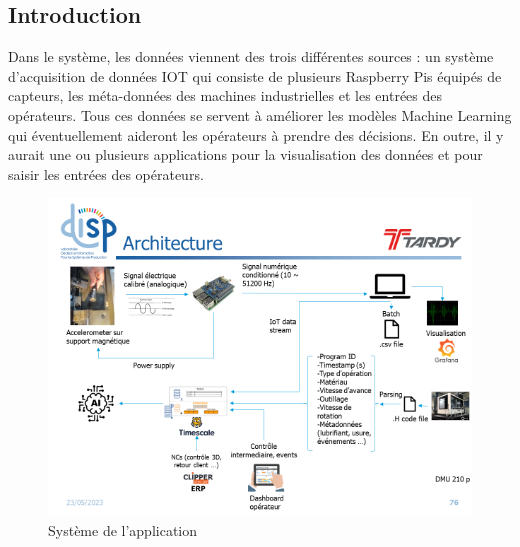 \documentclass{template}
\begin{document}
\subsection{Introduction}
Dans le système, les données viennent des trois différentes sources : un système d'acquisition de données IOT qui consiste de plusieurs Raspberry Pis équipés de capteurs, les méta-données des machines industrielles et les entrées des opérateurs. Tous ces données se servent à améliorer les modèles Machine Learning qui éventuellement aideront les opérateurs à prendre des décisions. En outre, il y aurait une ou plusieurs applications pour la visualisation des données et pour saisir les entrées des opérateurs.
\begin{figure}[h!]
    \includegraphics[scale=0.7]{Pics/SystemDataFlow.png}
    \centering
    \caption{Système de l'application}
    \label{fig:data_flow}
\end{figure}
\newpage
\end{document}
